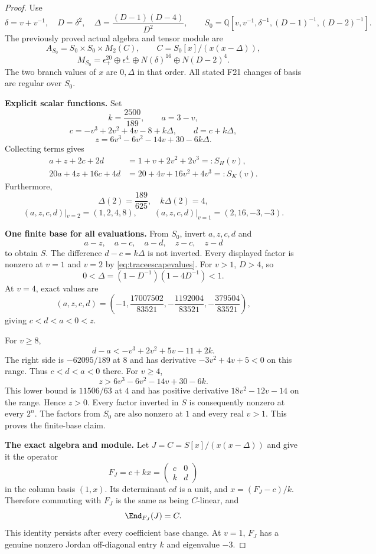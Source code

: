 \documentclass[11pt,a4paper]{article}
\theoremstyle{named}\newtheorem{finding}{Finding}[section]
\theoremstyle{definition}\newtheorem{definition}[finding]{Definition}
\theoremstyle{remark}\newtheorem{remark}[finding]{Remark}
\begin{document}
\begin{proof}
Use
\[
 \delta=v+v^{-1},\quad D=\delta^2,\quad
 \Delta=\frac{(D-1)(D-4)}{D^2},\qquad
 S_0=\mathbb Q[v,v^{-1},\delta^{-1},(D-1)^{-1},(D-2)^{-1}].
\]
The previously proved actual algebra and tensor module are
\[
 A_{S_0}=S_0\times S_0\times M_2(C),\qquad
 C=S_0[x]/(x(x-\Delta)),
\]
\[
 M_{S_0}=\epsilon_+^{20}\oplus\epsilon_-^4
       \oplus N(\delta)^{16}\oplus N(D-2)^4.
\]
The two branch values of $x$ are $0,\Delta$ in that order.
All stated F21 changes of basis are regular over $S_0$.

\par\smallskip\noindent\textbf{Explicit scalar functions.}\quad
Set
\[
 k=\frac{2500}{189},\qquad a=3-v,
\]
\[
 c=-v^3+2v^2+4v-8+k\Delta,\qquad d=c+k\Delta,
\]
\[
 z=6v^3-6v^2-14v+30-6k\Delta.
\]
Collecting terms gives
\begin{align}
 a+z+2c+2d&=1+v+2v^2+2v^3=:S_H(v),
       \label{eq:traceescapeH}\\
 20a+4z+16c+4d&=20+4v+16v^2+4v^3=:S_K(v).
       \label{eq:traceescapeK}
\end{align}
Furthermore,
\[
 \Delta(2)=\frac{189}{625},\quad k\Delta(2)=4,
\]
\begin{equation}\label{eq:traceescapevalues}
 (a,z,c,d)|_{v=2}=(1,2,4,8),\qquad
 (a,z,c,d)|_{v=1}=(2,16,-3,-3).
\end{equation}

\par\smallskip\noindent\textbf{One finite base for all evaluations.}\quad
From $S_0$, invert $a,z,c,d$ and
\[
 a-z,\quad a-c,\quad a-d,\quad z-c,\quad z-d
\]
to obtain $S$.
The difference $d-c=k\Delta$ is not inverted.
Every displayed factor is nonzero at $v=1$ and $v=2$
by \eqref{eq:traceescapevalues}.
For $v>1$, $D>4$, so
\[
 0<\Delta=(1-D^{-1})(1-4D^{-1})<1.
\]
At $v=4$, exact values are
\[
 (a,z,c,d)=
 \left(-1,\frac{17007502}{83521},
       -\frac{1192004}{83521},-\frac{379504}{83521}\right),
\]
giving $c<d<a<0<z$.

For $v\ge8$,
\[
 d-a<-v^3+2v^2+5v-11+2k.
\]
The right side is $-62095/189$ at $8$ and has derivative
$-3v^2+4v+5<0$ on this range.
Thus $c<d<a<0$ there.
For $v\ge4$,
\[
 z>6v^3-6v^2-14v+30-6k.
\]
This lower bound is $11506/63$ at $4$ and has positive
derivative $18v^2-12v-14$ on the range.
Hence $z>0$.
Every factor inverted in $S$ is consequently nonzero
at every $2^n$.
The factors from $S_0$ are also nonzero at $1$ and
every real $v>1$. This proves the finite-base claim.

\par\smallskip\noindent\textbf{The exact algebra and module.}\quad
Let $J=C=S[x]/(x(x-\Delta))$ and give it the operator
\[
 F_J=c+kx
     =\begin{pmatrix}c&0\\ k&d\end{pmatrix}
\]
in the column basis $(1,x)$.
Its determinant $cd$ is a unit, and
$x=(F_J-c)/k$.
Therefore commuting with $F_J$ is the same as being
$C$-linear, and
\[
 \End_{F_J}(J)=C.
\]
This identity persists after every coefficient base change.
At $v=1$, $F_J$ has a genuine nonzero Jordan off-diagonal
entry $k$ and eigenvalue $-3$.


\end{proof}
\end{document}
